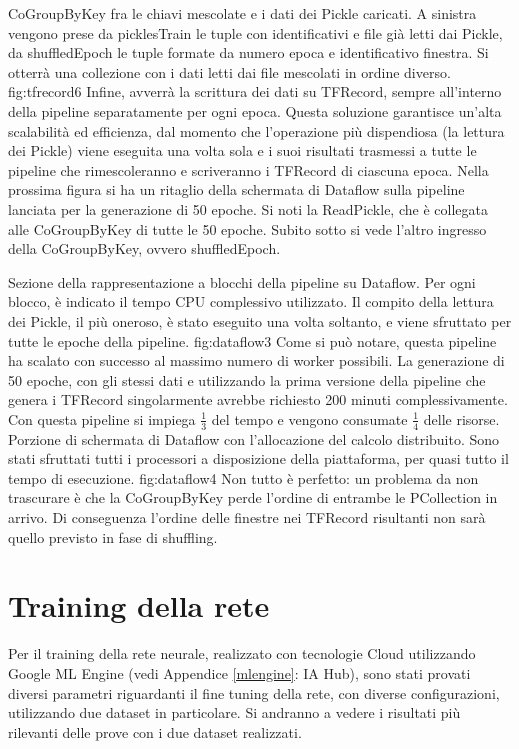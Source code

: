 {CoGroupByKey fra le chiavi mescolate e i dati dei Pickle caricati. A sinistra vengono prese da picklesTrain le tuple con identificativi e file già letti dai Pickle, da shuffledEpoch le tuple formate da numero epoca e identificativo finestra. Si otterrà una collezione con i dati letti dai file mescolati in ordine diverso. }
{fig:tfrecord6}
Infine, avverrà la scrittura dei dati su TFRecord, sempre all’interno della pipeline separatamente per ogni epoca. Questa soluzione garantisce un’alta scalabilità ed efficienza, dal momento che l’operazione più dispendiosa (la lettura dei Pickle) viene eseguita una volta sola e i suoi risultati trasmessi a tutte le pipeline che rimescoleranno e scriveranno i TFRecord di ciascuna epoca.
Nella prossima figura si ha un ritaglio della schermata di Dataflow sulla pipeline lanciata per la generazione di 50 epoche. Si noti la ReadPickle, che è collegata alle CoGroupByKey di tutte le 50 epoche. Subito sotto si vede l’altro ingresso della CoGroupByKey, ovvero shuffledEpoch.

{Sezione della rappresentazione a blocchi della pipeline su Dataflow. Per ogni blocco, è indicato il tempo CPU complessivo utilizzato. Il compito della lettura dei Pickle, il più oneroso, è stato eseguito una volta soltanto, e viene sfruttato per tutte le epoche della pipeline. }
{fig:dataflow3}
Come si può notare, questa pipeline ha scalato con successo al massimo numero di worker possibili. La generazione di 50 epoche, con gli stessi dati e utilizzando la prima versione della pipeline che genera i TFRecord singolarmente avrebbe richiesto 200 minuti complessivamente. Con questa pipeline si impiega $ \frac{1}{3} $ del tempo e vengono consumate $ \frac{1}{4} $ delle risorse.
{Porzione di schermata di Dataflow con l'allocazione del calcolo distribuito. Sono stati sfruttati tutti i processori a disposizione della piattaforma, per quasi tutto il tempo di esecuzione. }
{fig:dataflow4}
Non tutto è perfetto: un problema da non trascurare è che la CoGroupByKey perde l’ordine di entrambe le PCollection in arrivo. Di conseguenza l’ordine delle finestre nei TFRecord risultanti non sarà quello previsto in fase di shuffling.

\section{Training della rete}\label{training}
Per il training della rete neurale, realizzato con tecnologie Cloud utilizzando Google ML Engine (vedi Appendice \ref{mlengine}: IA Hub), sono stati provati diversi parametri riguardanti il fine tuning della rete, con diverse configurazioni, utilizzando due dataset in particolare. Si andranno a vedere i risultati più rilevanti delle prove con i due dataset realizzati.

